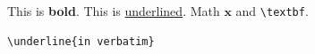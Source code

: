 This is \textbf{bold}.
This is \underline{underlined}.
Math $\textbf{x}$ and \verb|\textbf|.
\begin{verbatim}
\underline{in verbatim}
\end{verbatim}
